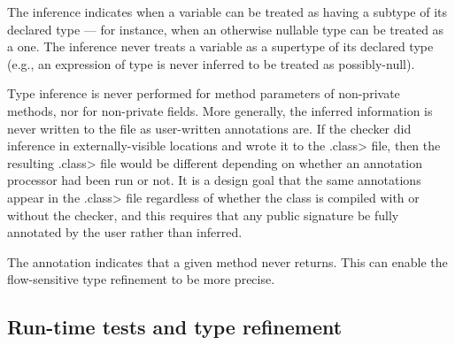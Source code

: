 %
%


The inference indicates when a variable can be treated as having a subtype
of its declared type --- for instance, when an otherwise nullable type can be
treated as a  one.  The inference never treats a variable as
a supertype of its declared type (e.g., an expression of 
type is never inferred to be treated as possibly-null).


Type inference is never performed for method parameters of non-private
methods, nor for non-private fields.  
More generally, the inferred information is never written to the
 file as user-written annotations are.
If the checker did inference in externally-visible locations and wrote it
to the \<.class> file, then the resulting \<.class> file would be different
depending on whether an annotation processor had been run or not.  It is a
design goal that the same annotations appear in the \<.class> file
regardless of whether the class is compiled with or without the checker,
and this requires that any public signature be fully annotated by the user
rather than inferred.


The  annotation
indicates that a given method never returns.  This can enable the 
flow-sensitive type refinement to be more precise.


\subsection{Run-time tests and type refinement\label{type-refinement-runtime-tests}}


